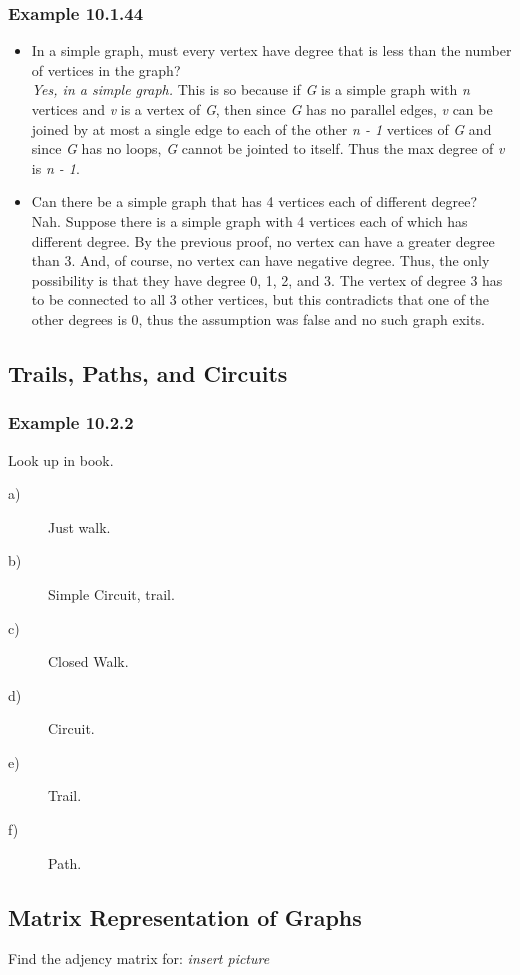\documentclass{article}
\begin{document}
\subsubsection{Example 10.1.44}
\begin{itemize}
\item In a simple graph, must every vertex have degree that is less than the number of vertices in the graph? \\
\textit{Yes, in a simple graph.} This is so because if \textit{G} is a simple graph with \textit{n} vertices and \textit{v} is a vertex of \textit{G}, then since \textit{G} has no parallel edges, \textit{v} can be joined by at most a single edge to each of the other \textit{n - 1} vertices of \textit{G} and since \textit{G} has no loops, \textit{G} cannot be jointed to itself. Thus the max degree of \textit{v} is \textit{n - 1}.

\item Can there be a simple graph that has 4 vertices each of different degree? \\
Nah. Suppose there is a simple graph with 4 vertices each of which has different degree. By the previous proof, no vertex can have a greater degree than 3. And, of course, no vertex can have negative degree. Thus, the only possibility is that they have degree 0, 1, 2, and 3. The vertex of degree 3 has to be connected to all 3 other vertices, but this contradicts that one of the other degrees is 0, thus the assumption was false and no such graph exits.
\end{itemize}

\subsection{Trails, Paths, and Circuits}
\subsubsection{Example 10.2.2}
Look up in book.
\begin{description}
\item[a)] Just walk.
\item[b)] Simple Circuit, trail.
\item[c)] Closed Walk.
\item[d)] Circuit.
\item[e)] Trail.
\item[f)] Path.
\end{description}

\subsection{Matrix Representation of Graphs}
Find the adjency matrix for: \textit{insert picture}
\end{document}
